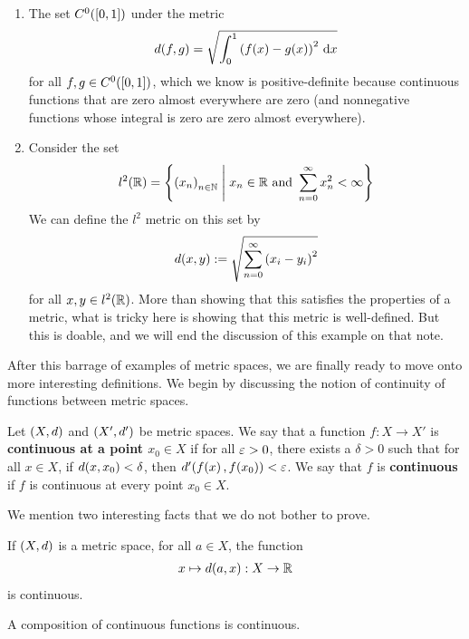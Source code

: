 \begin{boxexample}
\begin{enumerate}
        \item The set $C^0\!\left( \left[ 0, 1 \right] \right)$ under the metric
        \begin{align*}
            d(f, g) = \sqrt{\int_{0}^{1} \left( f(x) - g(x) \right)^2 \, \operatorname{d}\!x}
        \end{align*}
        for all $f, g \in C^0\!\left( \left[ 0, 1 \right] \right)$, which we know is positive-definite because continuous functions that are zero almost everywhere are zero (and nonnegative functions whose integral is zero are zero almost everywhere).

        \item Consider the set
        \begin{align*}
            l^2\!\left( \mathbb{R} \right) = \left\{ \left( x_n \right)_{n \in \mathbb{N}} \; \middle\vert \; x_n \in \mathbb{R} \text{ and } \sum_{n=0}^{\infty} x_n^2 < \infty \right\}
        \end{align*}
        We can define the $l^2$ metric on this set by
        \begin{align*}
            d(x, y) := \sqrt{\sum_{n=0}^{\infty} \left( x_i - y_i \right)^2}
        \end{align*}
        for all $x, y \in l^2\!\left( \mathbb{R} \right)$. More than showing that this satisfies the properties of a metric, what is tricky here is showing that this metric is well-defined. But this is doable, and we will end the discussion of this example on that note.
    \end{enumerate}
\end{boxexample}

After this barrage of examples of metric spaces, we are finally ready to move onto more interesting definitions. We begin by discussing the notion of continuity of functions between metric spaces.

\begin{boxdefinition}
    Let $\left( X, d \right)$ and $\left( X', d' \right)$ be metric spaces. We say that a function $f : X \to X'$ is \textbf{continuous at a point $x_0 \in X$} if for all $\varepsilon > 0$, there exists a $\delta > 0$ such that for all $x \in X$, if $d\!\left( x, x_0 \right) < \delta$, then $d'\!\left( f\!\left( x \right), f\!\left( x_0 \right) \right) < \varepsilon$. We say that $f$ is \textbf{continuous} if $f$ is continuous at every point $x_0 \in X$.
\end{boxdefinition}

We mention two interesting facts that we do not bother to prove.

\begin{boxexercise}
    If $\left( X, d \right)$ is a metric space, for all $a \in X$, the function
    \begin{align*}
        x \mapsto d\!\left( a, x \right) : X \to \mathbb{R}
    \end{align*}
    is continuous.
\end{boxexercise}

\begin{boxexercise}
    A composition of continuous functions is continuous.
\end{boxexercise}